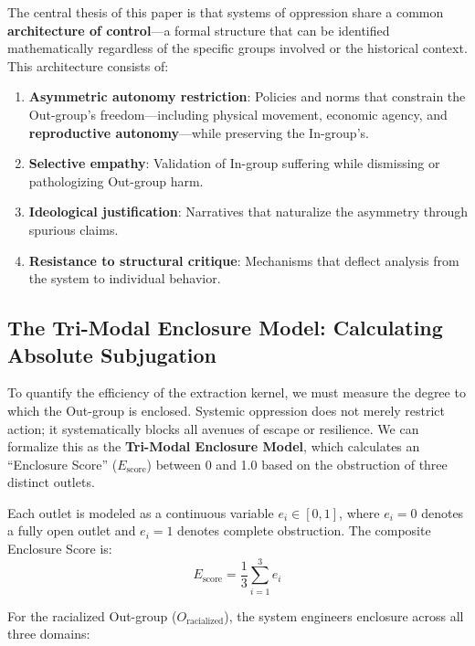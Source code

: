 \documentclass[12pt,openany]{book}
\begin{document}
The central thesis of this paper is that systems of oppression share a common \textbf{architecture of control}---a formal structure that can be identified mathematically regardless of the specific groups involved or the historical context. This architecture consists of:
\begin{enumerate}
    \item \textbf{Asymmetric autonomy restriction}: Policies and norms that constrain the Out-group's freedom---including physical movement, economic agency, and \textbf{reproductive autonomy}---while preserving the In-group's.
    \item \textbf{Selective empathy}: Validation of In-group suffering while dismissing or pathologizing Out-group harm.
    \item \textbf{Ideological justification}: Narratives that naturalize the asymmetry through spurious claims.
    \item \textbf{Resistance to structural critique}: Mechanisms that deflect analysis from the system to individual behavior.
\end{enumerate}

\subsection{The Tri-Modal Enclosure Model: Calculating Absolute Subjugation}

To quantify the efficiency of the extraction kernel, we must measure the degree to which the Out-group is enclosed. Systemic oppression does not merely restrict action; it systematically blocks all avenues of escape or resilience. We can formalize this as the \textbf{Tri-Modal Enclosure Model}, which calculates an ``Enclosure Score'' ($E_{\text{score}}$) between 0 and 1.0 based on the obstruction of three distinct outlets.

Each outlet is modeled as a continuous variable $e_i \in [0,1]$, where $e_i = 0$ denotes a fully open outlet and $e_i = 1$ denotes complete obstruction. The composite Enclosure Score is:
\[
E_{\text{score}} = \frac{1}{3}\sum_{i=1}^{3} e_i
\]

For the racialized Out-group ($O_{\text{racialized}}$), the system engineers enclosure across all three domains:
\end{document}
